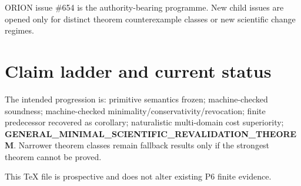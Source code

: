 \documentclass[11pt]{article}
\begin{document}
ORION issue \#654 is the authority-bearing programme. New child issues are opened only for distinct theorem counterexample classes or new scientific change regimes.

\section{Claim ladder and current status}
The intended progression is: primitive semantics frozen; machine-checked soundness; machine-checked minimality/conservativity/revocation; finite predecessor recovered as corollary; naturalistic multi-domain cost superiority; \textbf{GENERAL_MINIMAL_SCIENTIFIC_REVALIDATION_THEOREM}. Narrower theorem classes remain fallback results only if the strongest theorem cannot be proved.

This TeX file is prospective and does not alter existing P6 finite evidence.
\end{document}
